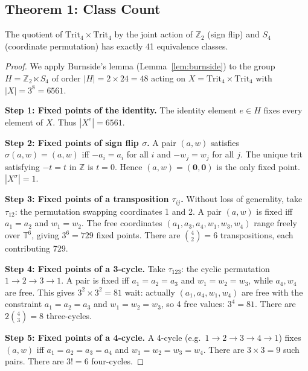 \subsection{Theorem 1: Class Count}
\label{subsec:thm_class_count}

\begin{theorem}
\label{thm:class_count}
The quotient of \(\mathrm{Trit}_4 \times \mathrm{Trit}_4\) by the
joint action of \(\mathbb{Z}_2\) (sign flip) and \(S_4\) (coordinate
permutation) has exactly 41 equivalence classes.
\end{theorem}

\begin{proof}
We apply Burnside's lemma (Lemma~\ref{lem:burnside}) to the group
\(H = \mathbb{Z}_2 \ltimes S_4\) of order \(|H| = 2 \times 24 = 48\)
acting on \(X = \mathrm{Trit}_4 \times \mathrm{Trit}_4\) with
\(|X| = 3^8 = 6561\).

\medskip
\noindent\textbf{Step 1: Fixed points of the identity.}
The identity element \(e \in H\) fixes every element of \(X\).
Thus \(|X^e| = 6561\).

\medskip
\noindent\textbf{Step 2: Fixed points of sign flip \(\sigma\).}
A pair \((a,w)\) satisfies \(\sigma(a,w) = (a,w)\) iff
\(-a_i = a_i\) for all \(i\) and \(-w_j = w_j\) for all \(j\).
The unique trit satisfying \(-t = t\) in \(\mathbb{Z}\) is \(t=0\).
Hence \((a,w) = (\mathbf{0},\mathbf{0})\) is the only fixed point.
\(|X^\sigma| = 1\).

\medskip
\noindent\textbf{Step 3: Fixed points of a transposition \(\tau_{ij}\).}
Without loss of generality, take \(\tau_{12}\): the permutation swapping
coordinates 1 and 2.  A pair \((a,w)\) is fixed iff \(a_1=a_2\) and
\(w_1=w_2\).  The free coordinates \((a_1, a_3, a_4, w_1, w_3, w_4)\)
range freely over \(\mathbb{T}^6\), giving \(3^6 = 729\) fixed points.
There are \(\binom{4}{2} = 6\) transpositions, each contributing 729.

\medskip
\noindent\textbf{Step 4: Fixed points of a 3-cycle.}
Take \(\tau_{123}\): the cyclic permutation \(1\to2\to3\to1\).
A pair is fixed iff \(a_1=a_2=a_3\) and \(w_1=w_2=w_3\), while
\(a_4, w_4\) are free.  This gives \(3^2 \times 3^2 = 81\) wait:
actually \((a_1, a_4, w_1, w_4)\) are free with the constraint
\(a_1=a_2=a_3\) and \(w_1=w_2=w_3\), so 4 free values:
\(3^4 = 81\).  There are \(2\binom{4}{3} = 8\) three-cycles.

\medskip
\noindent\textbf{Step 5: Fixed points of a 4-cycle.}
A 4-cycle (e.g.\ \(1\to2\to3\to4\to1\)) fixes \((a,w)\) iff
\(a_1=a_2=a_3=a_4\) and \(w_1=w_2=w_3=w_4\).  There are
\(3 \times 3 = 9\) such pairs.  There are \(3! = 6\) four-cycles.


\end{proof}
